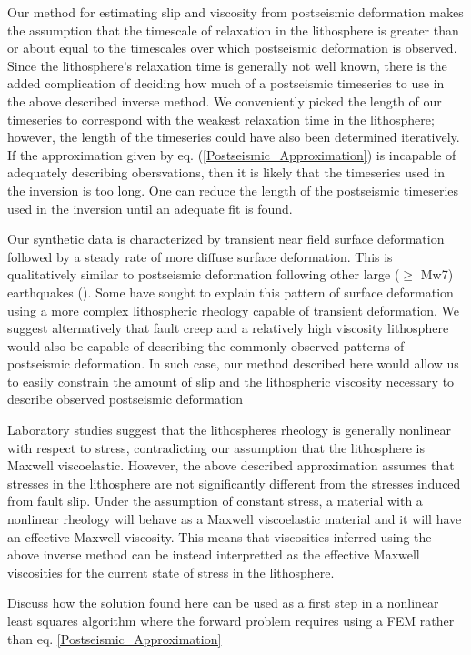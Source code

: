 \documentclass[12pt]{article}
\begin{document}
Our method for estimating slip and viscosity from postseismic
deformation makes the assumption that the timescale of relaxation in
the lithosphere is greater than or about equal to the timescales over
which postseismic deformation is observed.  Since the lithosphere's
relaxation time is generally not well known, there is the added
complication of deciding how much of a postseismic timeseries to use
in the above described inverse method.  We conveniently picked the
length of our timeseries to correspond with the weakest relaxation
time in the lithosphere; however, the length of the timeseries could
have also been determined iteratively.  If the approximation given by
eq. (\ref{Postseismic_Approximation}) is incapable of adequately
describing obersvations, then it is likely that the timeseries used in
the inversion is too long.  One can reduce the length of the
postseismic timeseries used in the inversion until an adequate fit is
found.

Our synthetic data is characterized by transient near field surface
deformation followed by a steady rate of more diffuse surface
deformation.  This is qualitatively similar to postseismic
deformation following other large ($\geq$ Mw7) earthquakes
(\citep{P2003,P2005,R2007,R2015}).  Some have sought to explain this
pattern of surface deformation using a more complex lithospheric
rheology capable of transient deformation. We suggest
alternatively that fault creep and a relatively high viscosity
lithosphere would also be capable of describing the commonly observed
patterns of postseismic deformation.  In such case, our method
described here would allow us to easily constrain the amount of slip
and the lithospheric viscosity necessary to describe observed
postseismic deformation

Laboratory studies suggest that the lithospheres rheology is generally
nonlinear with respect to stress, contradicting our assumption that
the lithosphere is Maxwell viscoelastic.  However, the above described
approximation assumes that stresses in the lithosphere are not
significantly different from the stresses induced from fault slip.
Under the assumption of constant stress, a material with a nonlinear
rheology will behave as a Maxwell viscoelastic material and it will
have an effective Maxwell viscosity.  This means that viscosities
inferred using the above inverse method can be instead interpretted as
the effective Maxwell viscosities for the current state of stress in
the lithosphere.

Discuss how the solution found here can be used as a first step in a
nonlinear least squares algorithm where the forward problem requires
using a FEM rather than eq. \ref{Postseismic_Approximation}
\end{document}
